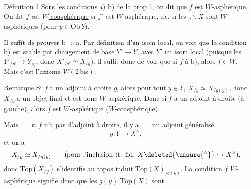 
\uline{Définition 1} Sous les conditions  a) b) de la prop 1, on dit que $f$ est \uline{$W$-asphérique}. On dit $f$ est \uline{$W$-coasphérique} si $f^\circ$ est $W$-asphérique, i.e. si les $ {}_{y}\backslash X$ sont $W$-asphériques (pour $y\in\mathrm{Ob}\,Y$).

  Il suffit de prouver $\mathrm b\Rightarrow\mathrm a$. Par définition d'un isom local, on voit que la condition b) est stable par changement de base $Y'\longrightarrow Y$, avec $Y'$ un isom local (puisque les $Y'_{/y'}\xrightarrow{\sim}Y_{/y}$, donc $X'_{/y'}\simeq X_{/y}$). Il suffit donc de voir que si $f$  à b), alors $f\in W$. Mais c'est l'axiome $W(2\,\mathrm{bis})$.

 

\uline{Remarque} Si $f$ a un adjoint à droite $g$, alors pour tout $y\in Y$, $X_{/y}\simeq X_{/g(y)}$, donc $X_{/y}$ a un objet final et est donc $W$-asphérique. Donc si $f$ a un adjoint à droite (à gauche), alors $f$ est $W$-asphérique ($W$-coasphérique).

Mais $=$ si $f$ n'a pas d'adjoint à droite, il y a  $=$ un adjoint généralisé \[g:Y\longrightarrow X^\wedge,\] et on a \[X_{/y}\simeq X_{/g(y)}\qquad(\text{pour l'inclusion tt. fid. }X\deleted{\unsure{{}^{\wedge}}}\hookrightarrow X^\wedge),\] donc $\mathrm{Top}(X_{/y})$ s'identifie au topos induit $\mathrm{Top}(X)_{/g(y)}$. La condition $f$ $W$-asphérique signifie donc que les  $g(y)$  $\mathrm{Top}(X)$ sont

